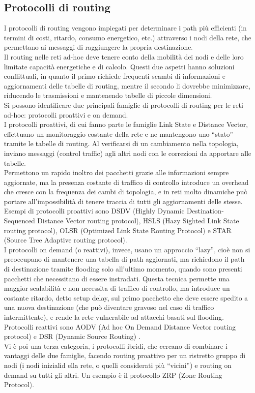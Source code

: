 \subsection[Protocolli di routing]{Protocolli di routing}
I protocolli di routing vengono impiegati per determinare i path più efficienti (in termini di costi, ritardo, consumo energetico, etc.) attraverso i nodi della rete, che permettano ai messaggi di raggiungere la propria destinazione. \\
Il routing nelle reti ad-hoc deve tenere conto della mobilità dei nodi e delle loro limitate capacità energetiche e di calcolo. 
Questi due aspetti hanno soluzioni conflittuali, in quanto il primo richiede frequenti scambi di informazioni e aggiornamenti delle tabelle di routing, mentre il secondo li dovrebbe minimizzare, riducendo le trasmissioni e mantenendo tabelle di piccole dimensioni. \\
Si possono identificare due principali famiglie di protocolli di routing per le reti ad-hoc: protocolli proattivi e on demand.\\
I protocolli proattivi, di cui fanno parte le famiglie Link State e Distance Vector, effettuano un monitoraggio costante della rete e ne mantengono uno “stato” tramite le tabelle di routing. 
Al verificarsi di un cambiamento nella topologia, inviano messaggi (control traffic) agli altri nodi con le correzioni da apportare alle tabelle.\\ Permettono un rapido inoltro dei pacchetti grazie alle informazioni sempre aggiornate, ma la presenza costante di traffico di controllo introduce un overhead che cresce con la frequenza dei cambi di topologia, e in reti molto dinamiche può portare all'impossibilità di tenere traccia di tutti gli aggiornamenti delle stesse. Esempi di protocolli proattivi sono DSDV (Highly Dynamic Destination-Sequenced Distance Vector routing protocol), HSLS (Hazy Sighted Link State routing protocol), OLSR (Optimized Link State Routing Protocol) e STAR (Source Tree Adaptive routing protocol).\\
I protocolli on demand (o reattivi), invece, usano un approccio “lazy”, cioè non si preoccupano di mantenere una tabella di path aggiornati, ma richiedono il path di destinazione tramite flooding solo all'ultimo momento, quando sono presenti pacchetti che necessitano di essere instradati.
Questa tecnica permette una maggior scalabilità e non necessita di traffico di controllo, ma introduce un costante ritardo, detto setup delay, sul primo pacchetto che deve essere spedito a una nuova destinazione (che può diventare gravoso nel caso di traffico intermittente), e rende la rete vulnerabile ad attacchi basati sul flooding. Protocolli reattivi sono AODV (Ad hoc On Demand Distance Vector routing protocol) e DSR (Dynamic Source Routing) \cite{879383}. \\
Vi è poi una terza categoria, i protocolli ibridi, che cercano di combinare i vantaggi delle due famiglie, facendo routing proattivo per un ristretto gruppo di nodi (i nodi inizialid ella rete, o quelli considerati più “vicini”) e routing on demand su tutti gli altri. Un esempio è il protocollo ZRP (Zone Routing Protocol).\\


